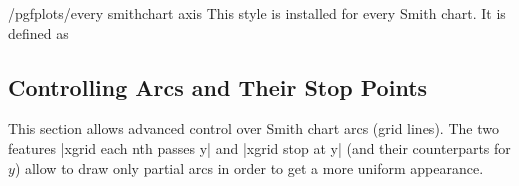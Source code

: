 \begin{stylekey}{/pgfplots/every smithchart axis}
    This style is installed for every Smith chart. It is defined as
\begin{codeexample}
\end{codeexample}
\end{stylekey}


\subsection{Controlling Arcs and Their Stop Points}

This section allows advanced control over Smith chart arcs (grid lines). The
two features |xgrid each nth passes y| and |xgrid stop at y| (and their
counterparts for $y$) allow to draw only partial arcs in order to get a more
uniform appearance.

